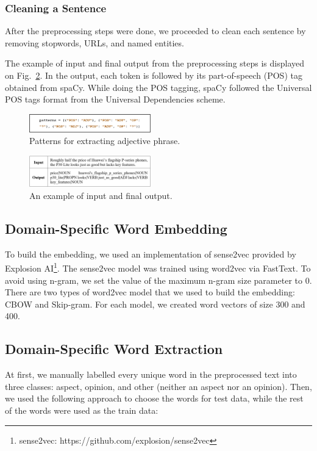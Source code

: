 \documentclass[a4paper,conference]{IEEEtran}
\begin{document}
\subsubsection{Cleaning a Sentence}
After the preprocessing steps were done, we proceeded to clean each sentence by removing stopwords, URLs, and named entities.

The example of input and final output from the preprocessing steps is displayed on Fig.~\ref{fig5}. In the output, each token is followed by its part-of-speech (POS) tag obtained from spaCy. While doing the POS tagging, spaCy followed the Universal POS tags format from the Universal Dependencies scheme.

\begin{figure}[htbp]
\centerline{\includegraphics[width=0.47\textwidth]{fig4.jpg}}
\caption{Patterns for extracting adjective phrase.}
\label{fig4}
\end{figure}

\begin{figure}[htbp]
\centerline{\includegraphics[width=0.47\textwidth]{fig5.jpg}}
\caption{An example of input and final output.}
\label{fig5}
\end{figure}

\subsection{Domain-Specific Word Embedding}
To build the embedding, we used an implementation of sense2vec provided by Explosion AI\footnote{sense2vec: https://github.com/explosion/sense2vec}. The sense2vec model was trained using word2vec via FastText. To avoid using n-gram, we set the value of the maximum n-gram size parameter to 0. There are two types of word2vec model that we used to build the embedding: CBOW and Skip-gram. For each model, we created word vectors of size 300 and 400.

\subsection{Domain-Specific Word Extraction}
At first, we manually labelled every unique word in the preprocessed text into three classes: aspect, opinion, and other (neither an aspect nor an opinion). Then, we used the following approach to choose the words for test data, while the rest of the words were used as the train data:
\end{document}
